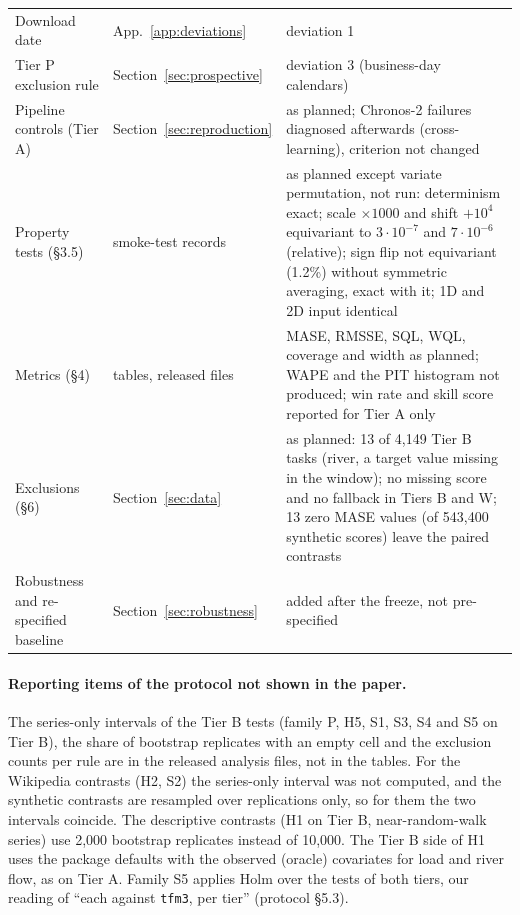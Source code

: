 \begin{table}[!htbp]
\begin{tabular}{p{4.2cm}p{2.4cm}p{8.2cm}}
Download date & App.~\ref{app:deviations} & deviation 1 \\
Tier P exclusion rule & Section~\ref{sec:prospective} & deviation 3 (business-day calendars) \\
Pipeline controls (Tier A) & Section~\ref{sec:reproduction} & as planned; Chronos-2 failures diagnosed afterwards (cross-learning),
criterion not changed \\
Property tests (\S3.5) & smoke-test records & as planned except variate permutation, not run: determinism exact; scale
$\times 1000$ and shift $+10^4$ equivariant to $3\cdot10^{-7}$ and $7\cdot10^{-6}$ (relative); sign flip not equivariant (1.2\%)
without symmetric averaging, exact with it; 1D and 2D input identical \\
Metrics (\S4) & tables, released files & MASE, RMSSE, SQL, WQL, coverage and width as planned; WAPE and the PIT histogram not produced;
win rate and skill score reported for Tier A only \\
Exclusions (\S6) & Section~\ref{sec:data} & as planned: 13 of 4{,}149 Tier B tasks (river, a target value missing in the window); no
missing score and no fallback in Tiers B and W; 13 zero MASE values (of 543{,}400 synthetic scores) leave the paired contrasts \\
Robustness and re-specified baseline & Section~\ref{sec:robustness} & added after the freeze, not pre-specified \\
\bottomrule
\end{tabular}
\end{table}

\paragraph{Reporting items of the protocol not shown in the paper.} The series-only intervals of the Tier B tests (family P, H5,
S1, S3, S4 and S5 on Tier B), the share of bootstrap replicates with an empty cell and the exclusion counts per rule are in the
released analysis files, not in the tables. For the Wikipedia contrasts (H2, S2) the series-only interval was not computed, and the
synthetic contrasts are resampled over replications only, so for them the two intervals coincide.
The descriptive contrasts (H1 on Tier B, near-random-walk series) use 2{,}000 bootstrap replicates instead of 10{,}000. The
Tier B side of H1 uses the package defaults with the observed (oracle) covariates for load and river flow, as on Tier A. Family S5
applies Holm over the tests of both tiers, our reading of ``each against \texttt{tfm3}, per tier'' (protocol \S{}5.3).

